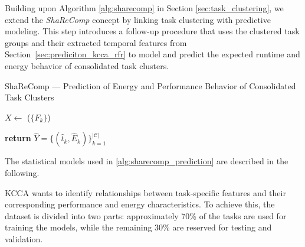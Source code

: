 Building upon Algorithm \ref{alg:sharecomp} in Section \ref{sec:task_clustering}, we extend the \textit{ShaReComp} concept by linking task clustering with predictive modeling. This step introduces a follow-up procedure that uses the clustered task groups and their extracted temporal features from Section~\ref{sec:prediciton_kcca_rfr} to model and predict the expected runtime and energy behavior of consolidated task clusters.

\begin{algorithm}[H]
    \caption{ShaReComp — Prediction of Energy and Performance Behavior of Consolidated Task Clusters}
    \label{alg:sharecomp_prediction}


    \BlankLine
    $X \gets$ \Build($\{F_k\}$) 

    \BlankLine
    \BlankLine
    \textbf{return } $\hat{Y} = \{ (\hat{t}_k, \hat{E}_k) \}_{k=1}^{|\mathcal{C}|}$
\end{algorithm}

The statistical models used in \ref{alg:sharecomp_prediction} are described in the following.

\label{sec:KCCA}

KCCA wants to identify relationships between task-specific features and their corresponding performance and energy characteristics. To achieve this, the dataset is divided into two parts: approximately 70\% of the tasks are used for training the models, while the remaining 30\% are reserved for testing and validation.

